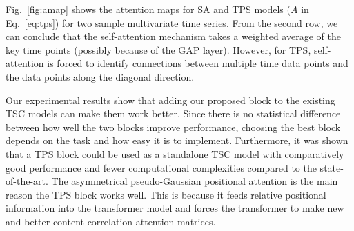 \documentclass[journal]{IEEEtran}
\begin{document}
Fig.~\ref{fig:amap} shows the attention maps for SA and TPS models ($A$ in Eq.~\eqref{eq:tps}) for two sample multivariate time series. From the second row, we can conclude that the self-attention mechanism takes a weighted average of the key time points (possibly because of the GAP layer). However, for TPS, self-attention is forced to identify connections between multiple time data points and the data points along the diagonal direction. 

Our experimental results show that adding our proposed block to the existing TSC models can make them work better. Since there is no statistical difference between how well the two blocks improve performance, choosing the best block depends on the task and how easy it is to implement. Furthermore, it was shown that a TPS block could be used as a standalone TSC model with comparatively good performance and fewer computational complexities compared to the state-of-the-art. The asymmetrical pseudo-Gaussian positional attention is the main reason the TPS block works well. This is because it feeds relative positional information into the transformer model and forces the transformer to make new and better content-correlation attention matrices.
\end{document}
